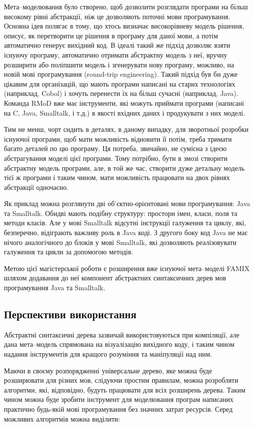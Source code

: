 \documentclass[12pt,a4paper]{article}
\begin{document}
Мета--моделювання було створено, щоб дозволити розглядати програми на більш високому рівні абстракції, ніж це дозволяють поточні мови програмування. Основна ідея полягає в тому, що хтось визначає високорівневу модель рішення, описує, як перетворити це рішення в програму для даної мови, а потім автоматично генерує вихідний код. В ідеалі такий же підхід дозволяє взяти існуючу програму, автоматично отримати абстрактну модель з неї, вручну розширити або поліпшити модель і згенерувати нову програму, можливо, на новій мові програмування (round-trip engineering). Такий підхід був би дуже цікавим для організацій, що мають програми написані на старих технологіях (наприклад, Cobol) і хочуть перенести їх на більш сучасні (наприклад, Java). Команда RMoD вже має інструменти, які можуть приймати програми (написані на C, Java, Smalltalk, і т.д.) в якості вхідних даних і продукувати з них моделі.

Тим не менш, чорт сидить в деталях, в даному випадку, для зворотньої розробки існуючої програми, щоб мати можливість відновити її потім, треба тримати багато деталей по цю програму. Ця потреба, звичайно, не сумісна з ідеєю абстрагування моделі цієї програми. Тому потрібно, бути в змозі створити абстрактну модель програми, але, в той же час, створити дуже детальну модель тієї ж програми і таким чином, мати можливість працювати на двох рівнях абстракції одночасно.

Як приклад можна розглянути дві об'єктно-орієнтовані мови програмування: Java та Smalltalk. Обидві мають подібну структуру: простори імен, класи, поля та методи класів. Але у мові Smalltalk відсутні інструкції галуження та циклу, які, безперечно, відіграють важливу роль в Java коді. З другого боку код Java не має нічого аналогічного до блоків у мові Smalltalk, які дозволяють реалізовувати галуження та цикли за допомогою методів.

Метою цієї магістерської роботи є розширення вже існуючої мета--моделі FAMIX шляхом додавання до неї компонент абстрактних синтаксичних дерев мов програмування Java та Smalltalk.

\subsection{Перспективи використання}
Абстрактні синтаксичні дерева зазвичай використовуються при компіляції, але дана мета--модель спрямована на візуалізацію вихідного коду, і таким чином надання інструментів для кращого розуміння та маніпуляції над ним.

Маючи в своєму розпорядженні універсальне дерево, яке можна буде розширювати для різних мов, слідуючи простим правилам, можна розробляти алгоритми, які, відповідно, будуть працювати для всіх розширень дерева. Таким чином можна буде зробити інструмент для моделювання програм написаних практично будь-якій мові програмування без значних затрат ресурсів. Серед можливих алгоритмів можна виділити:
\end{document}
